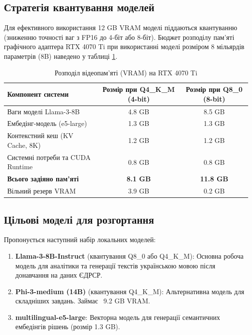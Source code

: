 \documentclass{article}
\begin{document}
\subsection{Стратегія квантування моделей}
Для ефективного використання 12 GB VRAM моделі піддаються квантуванню (зниженню точності ваг з FP16 до 4-біт або 8-біт).
Бюджет розподілу пам'яті графічного адаптера RTX 4070 Ti при використанні моделі розміром 8 мільярдів параметрів (8B) наведено у таблиці \ref{tab:vram_budget}.

\begin{table}[h]
\centering
\caption{Розподіл відеопам'яті (VRAM) на RTX 4070 Ti} \label{tab:vram_budget}
\vspace{10pt}
\begin{tabular}{lcc}
\toprule
\textbf{Компонент системи} & \textbf{Розмір при Q4\_K\_M (4-bit)} & \textbf{Розмір при Q8\_0 (8-bit)} \\
\midrule
Ваги моделі Llama-3-8B & 4.8 GB & 8.5 GB \\
Ембедінг-модель (e5-large) & 1.3 GB & 1.3 GB \\
Контекстний кеш (KV Cache, 8K) & 1.2 GB & 1.2 GB \\
Системні потреби та CUDA Runtime & 0.8 GB & 0.8 GB \\
\midrule
\textbf{Всього задіяно пам'яті} & \textbf{8.1 GB} & \textbf{11.8 GB} \\
\midrule
Вільний резерв VRAM & 3.9 GB & 0.2 GB \\
\bottomrule
\end{tabular}
\end{table}

\subsection{Цільові моделі для розгортання}
Пропонується наступний набір локальних моделей:
\begin{enumerate}
\item \textbf{Llama-3-8B-Instruct} (квантування Q8\_0 або Q4\_K\_M): Основна робоча модель для аналітики та генерації текстів українською мовою після донавчання на даних ЄДРСР.
\item \textbf{Phi-3-medium (14B)} (квантування Q4\_K\_M): Альтернативна модель для складніших завдань. Займає ~9.2 GB VRAM.
\item \textbf{multilingual-e5-large}: Векторна модель для генерації семантичних ембедінгів рішень (розмір 1.3 GB).
\end{enumerate}
\end{document}
